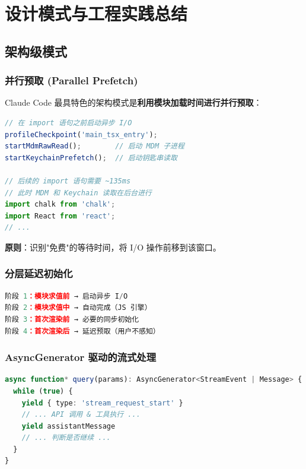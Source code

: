 \chapter{设计模式与工程实践总结}

\section{架构级模式}

\subsection{并行预取 (Parallel Prefetch)}

Claude Code 最具特色的架构模式是\textbf{利用模块加载时间进行并行预取}：

\begin{lstlisting}[language=TypeScript,breaklines=true]
// 在 import 语句之前启动异步 I/O
profileCheckpoint('main_tsx_entry');
startMdmRawRead();        // 启动 MDM 子进程
startKeychainPrefetch();  // 启动钥匙串读取

// 后续的 import 语句需要 ~135ms
// 此时 MDM 和 Keychain 读取在后台进行
import chalk from 'chalk';
import React from 'react';
// ...
\end{lstlisting}

\textbf{原则}：识别"免费"的等待时间，将 I/O 操作前移到该窗口。

\subsection{分层延迟初始化}

\begin{lstlisting}[language=TypeScript,breaklines=true]
阶段 1：模块求值前 → 启动异步 I/O
阶段 2：模块求值中 → 自动完成（JS 引擎）
阶段 3：首次渲染前 → 必要的同步初始化
阶段 4：首次渲染后 → 延迟预取（用户不感知）
\end{lstlisting}

\subsection{AsyncGenerator 驱动的流式处理}

\begin{lstlisting}[language=TypeScript,breaklines=true]
async function* query(params): AsyncGenerator<StreamEvent | Message> {
  while (true) {
    yield { type: 'stream_request_start' }
    // ... API 调用 & 工具执行 ...
    yield assistantMessage
    // ... 判断是否继续 ...
  }
}
\end{lstlisting}

